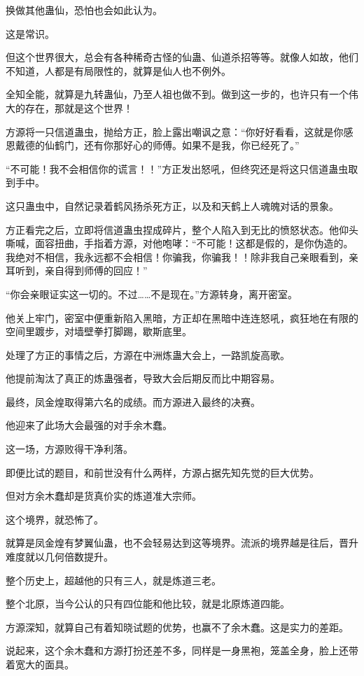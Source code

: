\begin{this_body}
换做其他蛊仙，恐怕也会如此认为。

这是常识。

但这个世界很大，总会有各种稀奇古怪的仙蛊、仙道杀招等等。就像人如故，他们不知道，人都是有局限性的，就算是仙人也不例外。

全知全能，就算是九转蛊仙，乃至人祖也做不到。做到这一步的，也许只有一个伟大的存在，那就是这个世界！

方源将一只信道蛊虫，抛给方正，脸上露出嘲讽之意：“你好好看看，这就是你感恩戴德的仙鹤门，还有你那好心的师傅。如果不是我，你已经死了。”

“不可能！我不会相信你的谎言！！”方正发出怒吼，但终究还是将这只信道蛊虫取到手中。

这只蛊虫中，自然记录着鹤风扬杀死方正，以及和天鹤上人魂魄对话的景象。

方正看完之后，立即将信道蛊虫捏成碎片，整个人陷入到无比的愤怒状态。他仰头嘶喊，面容扭曲，手指着方源，对他咆哮：“不可能！这都是假的，是你伪造的。我绝对不相信，我永远都不会相信！你骗我，你骗我！！除非我自己亲眼看到，亲耳听到，亲自得到师傅的回应！”

“你会亲眼证实这一切的。不过……不是现在。”方源转身，离开密室。

他关上牢门，密室中便重新陷入黑暗，方正却在黑暗中连连怒吼，疯狂地在有限的空间里踱步，对墙壁拳打脚踢，歇斯底里。

处理了方正的事情之后，方源在中洲炼蛊大会上，一路凯旋高歌。

他提前淘汰了真正的炼蛊强者，导致大会后期反而比中期容易。

最终，凤金煌取得第六名的成绩。而方源进入最终的决赛。

他迎来了此场大会最强的对手余木蠢。

这一场，方源败得干净利落。

即便比试的题目，和前世没有什么两样，方源占据先知先觉的巨大优势。

但对方余木蠢却是货真价实的炼道准大宗师。

这个境界，就恐怖了。

就算是凤金煌有梦翼仙蛊，也不会轻易达到这等境界。流派的境界越是往后，晋升难度就以几何倍数提升。

整个历史上，超越他的只有三人，就是炼道三老。

整个北原，当今公认的只有四位能和他比较，就是北原炼道四能。

方源深知，就算自己有着知晓试题的优势，也赢不了余木蠢。这是实力的差距。

说起来，这个余木蠢和方源打扮还差不多，同样是一身黑袍，笼盖全身，脸上还带着宽大的面具。


\end{this_body}
